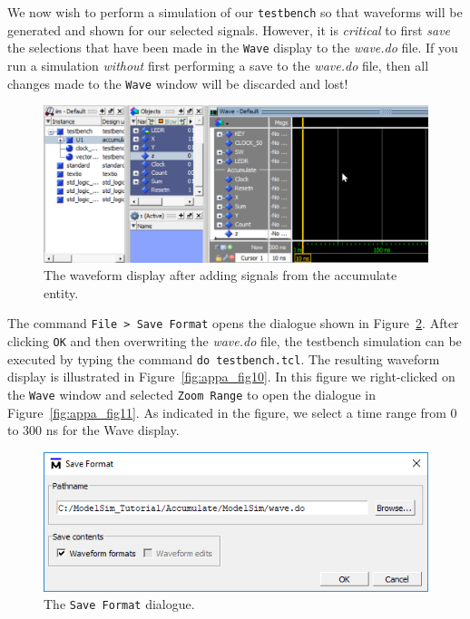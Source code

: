 \documentclass[11pt, twoside, pdftex]{article}
\begin{document}
We now wish to perform a simulation of our \texttt{testbench} so that waveforms will be 
generated and shown for our selected signals. 
However, it is {\it critical} to first {\it save} the selections
that have been made in the \texttt{Wave} display to the {\it wave.do} file. If you run a 
simulation {\it without} first performing a save to the {\it wave.do} file, then all 
changes made to the \texttt{Wave} window will be discarded and lost!  

\begin{figure}[h!]
	\begin{center}
		\includegraphics[width = \textwidth]{figures/appa_fig8.png}
	\end{center}
		  \caption{The waveform display after adding signals from the accumulate entity.}
	\label{fig:appa_fig8}
\end{figure}

\noindent
The command \texttt{File > Save Format} opens the dialogue shown in Figure~\ref{fig:appa_fig9}.
After clicking \texttt{OK} and then overwriting the {\it wave.do} file, the testbench 
simulation can be executed by typing the command \texttt{do testbench.tcl}. The resulting
waveform display is illustrated in Figure~\ref{fig:appa_fig10}. In this figure we
right-clicked on the \texttt{Wave} window and selected \texttt{Zoom Range} to open the
dialogue in Figure~\ref{fig:appa_fig11}. As indicated in the figure, we select a time range 
from 0 to 300 ns for the Wave display.

\begin{figure}[h!]
	\begin{center}
		\includegraphics[scale=0.8]{figures/appa_fig9.png}
	\end{center}
	\caption{The \texttt{Save Format} dialogue.}
	\label{fig:appa_fig9}
\end{figure}
\end{document}
